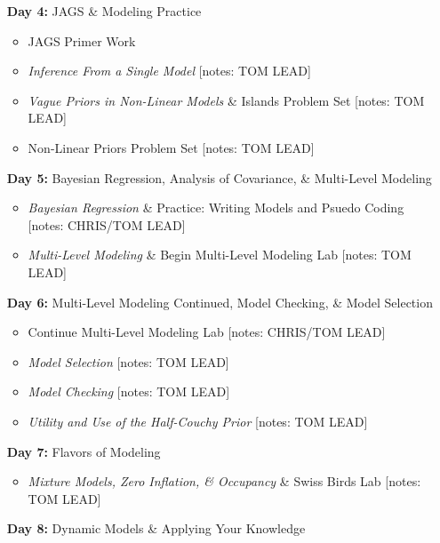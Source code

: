 \documentclass[11pt]{article}
\begin{document}
\begin{enumerate}
\newpage 

\item[\textbf{Day 4:}] JAGS \& Modeling Practice

\begin{itemize}
\item JAGS Primer Work
\item \emph{Inference From a Single Model}  [notes: TOM LEAD]
\item \emph{Vague Priors in Non-Linear Models} \& Islands Problem Set  [notes: TOM LEAD] 
\item Non-Linear Priors Problem Set  [notes: TOM LEAD]
\end{itemize}

\item[\textbf{Day 5:}] Bayesian Regression, Analysis of Covariance, \& Multi-Level Modeling

\begin{itemize}
\item \emph{Bayesian Regression} \& Practice: Writing Models and Psuedo Coding [notes: CHRIS/TOM LEAD]
\item \emph{Multi-Level Modeling} \& Begin Multi-Level Modeling Lab  [notes: TOM LEAD] 
\end{itemize}


\item[\textbf{Day 6:}] Multi-Level Modeling Continued, Model Checking, \& Model Selection

\begin{itemize}
\item  Continue Multi-Level Modeling Lab  [notes: CHRIS/TOM LEAD]
\item \emph{Model Selection} [notes: TOM LEAD]
\item \emph{Model Checking} [notes: TOM LEAD] 
\item \emph{Utility and Use of the Half-Couchy Prior} [notes: TOM LEAD]
\end{itemize}

\item[\textbf{Day 7:}] Flavors of Modeling

\begin{itemize}
\item \emph{Mixture Models, Zero Inflation, \& Occupancy} \& Swiss Birds Lab [notes: TOM LEAD]
\end{itemize}

\item[\textbf{Day 8:}] Dynamic Models \& Applying Your Knowledge


\end{enumerate}
\end{document}
